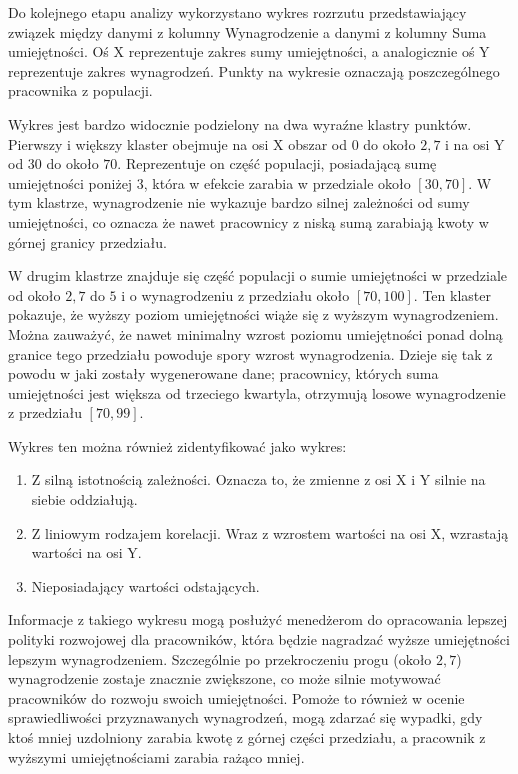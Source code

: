     \par Do kolejnego etapu analizy wykorzystano wykres rozrzutu przedstawiający związek między danymi z kolumny Wynagrodzenie a danymi z kolumny Suma umiejętności. Oś X reprezentuje zakres sumy umiejętności, a analogicznie oś Y reprezentuje zakres wynagrodzeń. Punkty na wykresie oznaczają poszczególnego pracownika z populacji.

    \par Wykres jest bardzo widocznie podzielony na dwa wyraźne klastry punktów. Pierwszy i większy klaster obejmuje na osi X obszar od $0$ do około $2,7$ i na osi Y od $30$ do około $70$. Reprezentuje on część populacji, posiadającą sumę umiejętności poniżej $3$, która w efekcie zarabia w przedziale około $[30, 70]$. W tym klastrze, wynagrodzenie nie wykazuje bardzo silnej zależności od sumy umiejętności, co oznacza że nawet pracownicy z niską sumą zarabiają kwoty w górnej granicy przedziału. 

    \par W drugim klastrze znajduje się część populacji o sumie umiejętności w przedziale od około $2,7$ do $5$ i o wynagrodzeniu z przedziału około $[70, 100]$. Ten klaster pokazuje, że wyższy poziom umiejętności wiąże się z wyższym wynagrodzeniem. Można zauważyć, że nawet minimalny wzrost poziomu umiejętności ponad dolną granice tego przedziału powoduje spory wzrost wynagrodzenia. Dzieje się tak z powodu w jaki zostały wygenerowane dane; pracownicy, których suma umiejętności jest większa od trzeciego kwartyla, otrzymują losowe wynagrodzenie z przedziału $[70, 99]$. 

    \par Wykres ten można również zidentyfikować jako wykres:
    \begin{enumerate}
        \item Z silną istotnością zależności. Oznacza to, że zmienne z osi X i Y silnie na siebie oddziałują.
        \item Z liniowym rodzajem korelacji. Wraz z wzrostem wartości na osi X, wzrastają wartości na osi Y.
        \item Nieposiadający wartości odstających.
    \end{enumerate}

    \par Informacje z takiego wykresu mogą posłużyć menedżerom do opracowania lepszej polityki rozwojowej dla pracowników, która będzie nagradzać wyższe umiejętności lepszym wynagrodzeniem. Szczególnie po przekroczeniu progu (około $2,7$) wynagrodzenie zostaje znacznie zwiększone, co może silnie motywować pracowników do rozwoju swoich umiejętności. Pomoże to również w ocenie sprawiedliwości przyznawanych wynagrodzeń, mogą zdarzać się wypadki, gdy ktoś mniej uzdolniony zarabia kwotę z górnej części przedziału, a pracownik z wyższymi umiejętnościami zarabia rażąco mniej.


